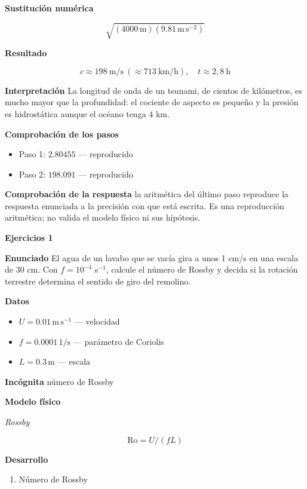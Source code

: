 \documentclass[10pt,openany]{book}
\begin{document}
\noindent\textbf{Sustitución numérica}

\[
\sqrt{\left(4000\,\mathrm{m}\right) \left(9.81\,\mathrm{m}\,\mathrm{s}^{-2}\right)}
\]

\noindent\textbf{Resultado}

\[
c \approx 198\ \mathrm{m/s}\ (\approx 713\ \mathrm{km/h}),\quad t \approx 2{,}8\ \mathrm{h}
\]

\noindent\textbf{Interpretación}
La longitud de onda de un tsunami, de cientos de kilómetros, es mucho mayor que la profundidad: el cociente de aspecto es pequeño y la presión es hidrostática aunque el océano tenga 4 km.

\noindent\textbf{Comprobación de los pasos}
\begin{itemize}
\item Paso 1: $2.80455$ — reproducido
\item Paso 2: $198.091$ — reproducido
\end{itemize}

\noindent\textbf{Comprobación de la respuesta} la aritmética del último paso reproduce la respuesta enunciada a la precisión con que está escrita. Es una reproducción aritmética; no valida el modelo físico ni sus hipótesis.

\noindent\textbf{Ejercicios 1}

\noindent\textbf{Enunciado}
El agua de un lavabo que se vacía gira a unos 1 cm/s en una escala de 30 cm. Con \(f = 10^{-4}\) s\(^{-1}\), calcule el número de Rossby y decida si la rotación terrestre determina el sentido de giro del remolino.

\noindent\textbf{Datos}
\begin{itemize}
\item $U = 0.01\,\mathrm{m}\,\mathrm{s}^{-1}$ — velocidad
\item $f = 0.0001\,\mathrm{1/s}$ — parámetro de Coriolis
\item $L = 0.3\,\mathrm{m}$ — escala
\end{itemize}

\noindent\textbf{Incógnita}
número de Rossby

\noindent\textbf{Modelo físico}

\noindent\textit{Rossby}

\[
\mathrm{Ro} = U/(fL)
\]

\noindent\textbf{Desarrollo}
\begin{enumerate}
\item
Número de Rossby
\end{enumerate}
\end{document}
